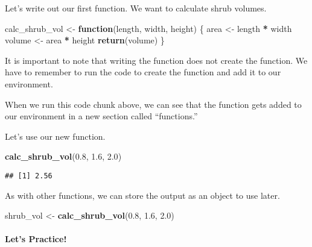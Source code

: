 \documentclass[
]{article}
\newenvironment{Shaded}{\begin{snugshade}}{\end{snugshade}}
\newcommand{\ControlFlowTok}[1]{\textcolor[rgb]{0.13,0.29,0.53}{\textbf{#1}}}
\newcommand{\FloatTok}[1]{\textcolor[rgb]{0.00,0.00,0.81}{#1}}
\newcommand{\FunctionTok}[1]{\textcolor[rgb]{0.13,0.29,0.53}{\textbf{#1}}}
\newcommand{\NormalTok}[1]{#1}
\newcommand{\OtherTok}[1]{\textcolor[rgb]{0.56,0.35,0.01}{#1}}
\newcommand{\SpecialCharTok}[1]{\textcolor[rgb]{0.81,0.36,0.00}{\textbf{#1}}}
\begin{document}
Let's write out our first function. We want to calculate shrub volumes.

\begin{Shaded}
\begin{Highlighting}[]
\NormalTok{calc\_shrub\_vol }\OtherTok{\textless{}{-}} \ControlFlowTok{function}\NormalTok{(length, width, height) \{}
\NormalTok{  area }\OtherTok{\textless{}{-}}\NormalTok{ length }\SpecialCharTok{*}\NormalTok{ width}
\NormalTok{  volume }\OtherTok{\textless{}{-}}\NormalTok{ area }\SpecialCharTok{*}\NormalTok{ height}
  \FunctionTok{return}\NormalTok{(volume)}
\NormalTok{\}}
\end{Highlighting}
\end{Shaded}

It is important to note that writing the function does not create the
function. We have to remember to run the code to create the function and
add it to our environment.

When we run this code chunk above, we can see that the function gets
added to our environment in a new section called ``functions.''

Let's use our new function.

\begin{Shaded}
\begin{Highlighting}[]
\FunctionTok{calc\_shrub\_vol}\NormalTok{(}\FloatTok{0.8}\NormalTok{, }\FloatTok{1.6}\NormalTok{, }\FloatTok{2.0}\NormalTok{)}
\end{Highlighting}
\end{Shaded}

\begin{verbatim}
## [1] 2.56
\end{verbatim}

As with other functions, we can store the output as an object to use
later.

\begin{Shaded}
\begin{Highlighting}[]
\NormalTok{shrub\_vol }\OtherTok{\textless{}{-}} \FunctionTok{calc\_shrub\_vol}\NormalTok{(}\FloatTok{0.8}\NormalTok{, }\FloatTok{1.6}\NormalTok{, }\FloatTok{2.0}\NormalTok{)}
\end{Highlighting}
\end{Shaded}

\hypertarget{lets-practice}{%
\paragraph{Let's Practice!}\label{lets-practice}}
\end{document}
